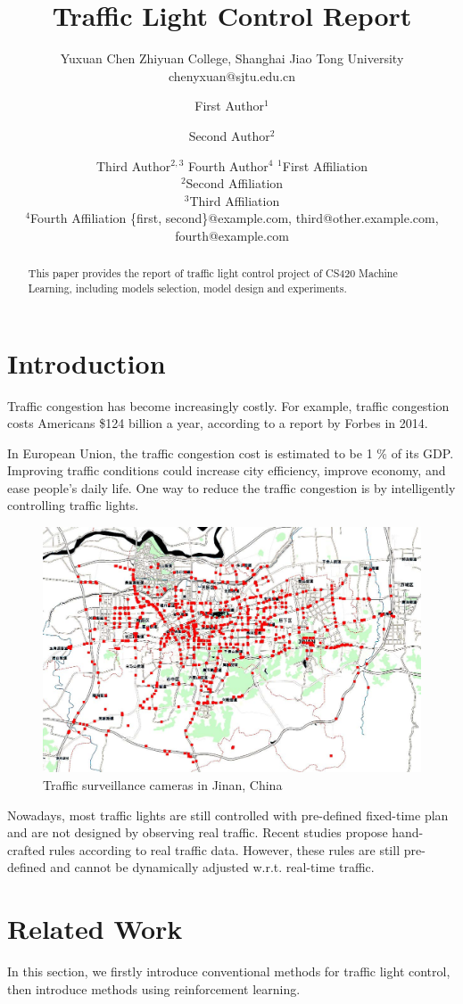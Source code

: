 \documentclass{article}
\title{Traffic Light Control Report}
\author{
    Yuxuan Chen
    \affiliations
    Zhiyuan College, Shanghai Jiao Tong University \emails
    chenyxuan@sjtu.edu.cn
}
\author{
First Author$^1$
\and
Second Author$^2$\and
Third Author$^{2,3}$\And
Fourth Author$^4$
\affiliations
$^1$First Affiliation\\
$^2$Second Affiliation\\
$^3$Third Affiliation\\
$^4$Fourth Affiliation
\emails
\{first, second\}@example.com,
third@other.example.com,
fourth@example.com
}
\begin{document}
\maketitle

\begin{abstract}
This paper provides the report of traffic light control project of CS420 Machine Learning, including models selection, model design and experiments. 
\end{abstract}

\section{Introduction}
\quad Traffic congestion has become increasingly costly. For example, traffic congestion costs Americans \$124 billion a year, according to a report by Forbes in 2014.

In European Union, the traffic congestion cost is estimated to be 1 \% of its GDP. Improving traffic conditions could increase city efficiency, improve economy, and ease people’s daily life. One way to reduce the traffic congestion is by intelligently controlling traffic lights.

\begin{figure}[H]
\centering
\includegraphics[width=.4\textwidth]{jn.png}
\caption{Traffic surveillance cameras in Jinan, China}
\end{figure}


Nowadays, most traffic lights are still controlled with pre-defined fixed-time plan and are not designed by observing real traffic. Recent studies propose hand-crafted rules according to real traffic data. However, these rules are still pre-defined and cannot be dynamically adjusted w.r.t. real-time traffic.




\section{Related Work}
\quad In this section, we firstly introduce conventional methods for traffic light control, then introduce methods using reinforcement learning.
\end{document}
